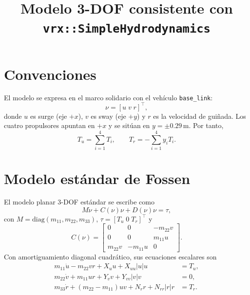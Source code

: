 \documentclass[11pt,a4paper]{article}
\title{Modelo 3-DOF consistente con \texttt{vrx::SimpleHydrodynamics}}
\author{}
\date{}
\begin{document}
\maketitle

\section{Convenciones}
El modelo se expresa en el marco solidario con el vehículo \texttt{base\_link}:
\begin{equation}
\nu = [u\;v\;r]^\top,
\end{equation}
donde $u$ es surge (eje $+x$), $v$ es sway (eje $+y$) y $r$ es la velocidad de guiñada. Los cuatro propulsores apuntan en $+x$ y se sitúan en $y=\pm0.29\,\mathrm{m}$. Por tanto,
\begin{equation}
 T_u=\sum_{i=1}^{4}T_i,\qquad
 T_r=-\sum_{i=1}^{4}y_iT_i.
\end{equation}

\section{Modelo estándar de Fossen}
El modelo planar 3-DOF estándar se escribe como
\begin{equation}
 M\dot\nu+C(\nu)\nu+D(\nu)\nu=\tau,
\end{equation}
con $M=\mathrm{diag}(m_{11},m_{22},m_{33})$, $\tau=[T_u\;0\;T_r]^\top$ y
\begin{equation}
C(\nu)=
\begin{bmatrix}
0&0&-m_{22}v\\
0&0&m_{11}u\\
m_{22}v&-m_{11}u&0
\end{bmatrix}.
\end{equation}
Con amortiguamiento diagonal cuadrático, sus ecuaciones escalares son
\begin{align}
m_{11}\dot u-m_{22}vr+X_u u+X_{uu}|u|u &=T_u,\\
m_{22}\dot v+m_{11}ur+Y_v v+Y_{vv}|v|v &=0,\\
m_{33}\dot r+(m_{22}-m_{11})uv+N_r r+N_{rr}|r|r&=T_r.
\end{align}
\end{document}
